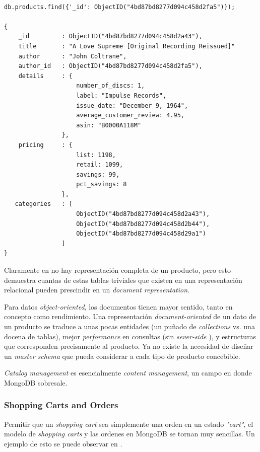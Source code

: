 \medskip
\begin{lstlisting}[caption= Busqueda en MongoDB, label=source:javascript:example_search_mongodb]

db.products.find({'_id': ObjectID("4bd87bd8277d094c458d2fa5")});

{
	_id			: ObjectID("4bd87bd8277d094c458d2a43"),
	title		: "A Love Supreme [Original Recording Reissued]"
	author		: "John Coltrane",
	author_id	: ObjectID("4bd87bd8277d094c458d2fa5"),
	details		: {
					number_of_discs: 1,
					label: "Impulse Records",
   					issue_date: "December 9, 1964",
   					average_customer_review: 4.95,
   					asin: "B0000A118M"
   				},
   	pricing		: {
   					list: 1198,
   					retail: 1099,
   					savings: 99,
   					pct_savings: 8
   				},
   categories	: [
   					ObjectID("4bd87bd8277d094c458d2a43"),
   					ObjectID("4bd87bd8277d094c458d2b44"), 
   					ObjectID("4bd87bd8277d094c458d29a1")
   				]
}
\end{lstlisting}

Claramente en  no hay  representación completa de un producto, pero esto demuestra cuantas de estas tablas triviales que existen en una representación relacional pueden prescindir en un \textit{document representation}.

Para datos \textit{object-oriented}, los documentos tienen mayor sentido, tanto en concepto como rendimiento. Una representación \textit{document-oriented} de un dato de un producto se traduce a unas pocas entidades (un puñado de \textit{collections} vs. una docena de tablas), mejor \textit{performance} en consultas (sin \textit{sever-side} \joins), y estructuras que corresponden precisamente al producto. Ya no existe la necesidad de diseñar un \textit{master schema} que pueda considerar a cada tipo de producto concebible.

\textit{Catalog management} es esencialmente \textit{content management}, un campo en donde MongoDB sobresale.

\subsubsection{Shopping Carts and Orders}

Permitir que un \textit{shopping cart} sea simplemente una orden en un estado  \textit{"cart"}, el modelo de \textit{shopping carts} y las ordenes en MongoDB se tornan muy sencillas. Un ejemplo de esto se puede observar en  .

